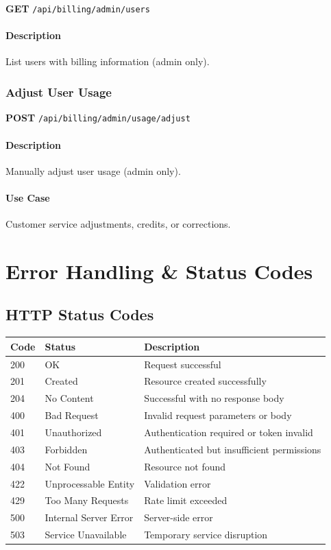\documentclass[11pt,a4paper]{report}
\begin{document}
\textbf{GET} \texttt{/api/billing/admin/users}

\subsubsection{Description}
List users with billing information (admin only).

\subsection{Adjust User Usage}

\textbf{POST} \texttt{/api/billing/admin/usage/adjust}

\subsubsection{Description}
Manually adjust user usage (admin only).

\subsubsection{Use Case}
Customer service adjustments, credits, or corrections.

\newpage

\chapter{Error Handling \& Status Codes}

\section{HTTP Status Codes}

\begin{longtable}{|l|l|p{8cm}|}
\hline
\textbf{Code} & \textbf{Status} & \textbf{Description} \\ \hline
\endhead

200 & OK & Request successful \\ \hline
201 & Created & Resource created successfully \\ \hline
204 & No Content & Successful with no response body \\ \hline
400 & Bad Request & Invalid request parameters or body \\ \hline
401 & Unauthorized & Authentication required or token invalid \\ \hline
403 & Forbidden & Authenticated but insufficient permissions \\ \hline
404 & Not Found & Resource not found \\ \hline
422 & Unprocessable Entity & Validation error \\ \hline
429 & Too Many Requests & Rate limit exceeded \\ \hline
500 & Internal Server Error & Server-side error \\ \hline
503 & Service Unavailable & Temporary service disruption \\ \hline

\end{longtable}
\end{document}
